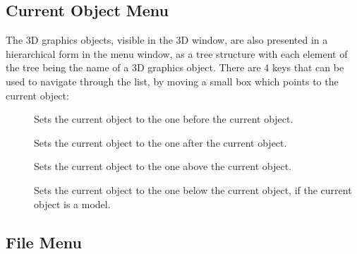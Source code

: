 
\subsection{Current Object Menu}

The 3D graphics objects, visible in the 3D window, are also presented
in a hierarchical form in the menu window, as a tree structure with
each element of the tree being the name of a 3D graphics object.
There are 4 keys that can be used to navigate through the list, by
moving a small box which points to the current object:

\begin{description}
\item[]  Sets the current object to the one before
                the current object.
\item[]  Sets the current object to the one after
                the current object.
\item[]  Sets the current object to the one above
                the current object.
\item[]  Sets the current object to the one below
                the current object, if the current object is a model.
\end{description}

\subsection{File Menu}

